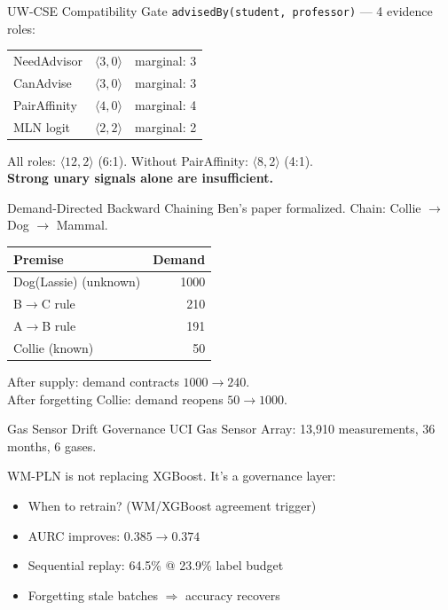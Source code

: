 \documentclass[aspectratio=169,11pt]{beamer}
\begin{document}
\begin{frame}{UW-CSE Compatibility Gate}
\texttt{advisedBy(student, professor)} --- 4 evidence roles:

\bigskip
\begin{tabular}{lrl}
NeedAdvisor & $\langle 3, 0 \rangle$ & marginal: 3 \\
CanAdvise & $\langle 3, 0 \rangle$ & marginal: 3 \\
\alert{PairAffinity} & $\langle 4, 0 \rangle$ & marginal: \alert{4} \\
MLN logit & $\langle 2, 2 \rangle$ & marginal: 2 \\
\end{tabular}

\bigskip
All roles: $\langle 12, 2 \rangle$ (6:1).
Without PairAffinity: $\langle 8, 2 \rangle$ (4:1).\\[6pt]
\textbf{Strong unary signals alone are insufficient.}
\end{frame}

\begin{frame}{Demand-Directed Backward Chaining}
Ben's paper formalized. Chain: Collie $\to$ Dog $\to$ Mammal.

\bigskip
\begin{tabular}{lr}
\toprule
Premise & Demand \\
\midrule
\alert{Dog(Lassie)} (unknown) & \alert{1000} \\
B$\to$C rule & 210 \\
A$\to$B rule & 191 \\
Collie (known) & 50 \\
\bottomrule
\end{tabular}

\bigskip
After supply: demand \alert{contracts} $1000 \to 240$.\\
After forgetting Collie: demand \alert{reopens} $50 \to 1000$.
\end{frame}

\begin{frame}{Gas Sensor Drift Governance}
UCI Gas Sensor Array: 13,910 measurements, 36 months, 6 gases.

\bigskip
WM-PLN is \alert{not replacing XGBoost}. It's a governance layer:
\begin{itemize}
\item When to retrain? (WM/XGBoost agreement trigger)
\item AURC improves: $0.385 \to 0.374$
\item Sequential replay: 64.5\% @ 23.9\% label budget
\item Forgetting stale batches $\Rightarrow$ accuracy recovers
\end{itemize}
\end{frame}
\end{document}
